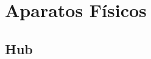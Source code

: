 \documentclass[12pt, fleqn]{report}                             %
\theoremstyle{break}                                            %
\begin{document}

























\part{Aparatos Físicos}
\clearpage

    
    \chapter{Hub}


\end{document}
